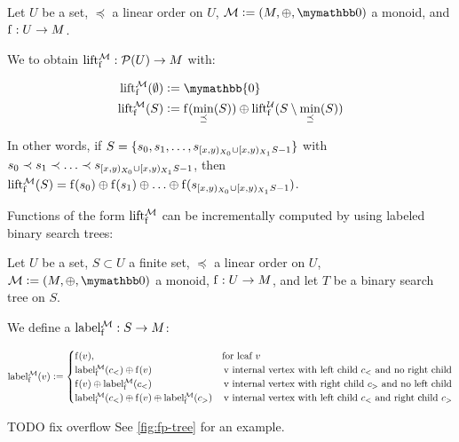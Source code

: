 \begin{definition}
Let $U$ be a set, $\preceq$ a linear order on $U$, $\mathcal{M} \defeq (M, \groupaddsym, \neutraladd)$ a monoid, and ${\operatorname{f}}: {U} \rightarrow {M}$.

We  to obtain ${\operatorname{lift_{\operatorname{f}}^{\mathcal{M}}}}: {\mathcal{P}({U})} \rightarrow {M}$ with:

\begin{align*}
\lift{\f}{\mathcal{M}}(\emptyset) &\defeq \mymathbb{0}\\
\lift{\f}{\mathcal{M}}(S) &\defeq \f(\min_{\preceq}(S)) \oplus \lift{\f}{\mathcal{U}}(S \setminus \min_{\preceq}(S))\\
\end{align*}

In other words, if $S = \{s_0, s_1, \ldots, s_{[{x},{y})_{X_0} \cup [{x},{y})_{X_1}{S} - 1}\}$ with $s_0 \prec s_1 \prec \ldots \prec s_{[{x},{y})_{X_0} \cup [{x},{y})_{X_1}{S} - 1}$, then $\operatorname{lift_{\operatorname{f}}^{\mathcal{M}}}(S) = {\operatorname{f}(s_0)} \oplus {{\operatorname{f}(s_1)} \oplus{{\ldots} \oplus{\operatorname{f}(s_{[{x},{y})_{X_0} \cup [{x},{y})_{X_1}{S} - 1})}}}$.
\end{definition}

Functions of the form $\operatorname{lift_{\operatorname{f}}^{\mathcal{M}}}$ can be incrementally computed by using labeled binary search trees:

\begin{definition}
Let $U$ be a set, $S \subset U$ a finite set, $\preceq$ a linear order on $U$, $\mathcal{M} \defeq (M, \groupaddsym, \neutraladd)$ a monoid, ${\operatorname{f}}: {U} \rightarrow {M}$, and let $T$ be a binary search tree on $S$.

We define a  ${\operatorname{label_{\operatorname{f}}^{\mathcal{M}}}}: {S} \rightarrow {M}$:

  \[
   \operatorname{label_{\operatorname{f}}^{\mathcal{M}}}(v) \vcentcolon= \begin{cases}
\operatorname{f}(v), &  \text{for leaf $v$} \\
{\operatorname{label_{\operatorname{f}}^{\mathcal{M}}}(c_{<})} \oplus {\operatorname{f}(v)} & \, \text{v internal vertex with left child $c_{<}$ and no right child}\\
{\operatorname{f}(v)} \oplus {\operatorname{label_{\operatorname{f}}^{\mathcal{M}}}(c_{<})} & \, \text{v internal vertex with right child $c_{>}$ and no left child}\\
{\operatorname{label_{\operatorname{f}}^{\mathcal{M}}}(c_{<})} \oplus {{\operatorname{f}(v)} \oplus{\operatorname{label_{\operatorname{f}}^{\mathcal{M}}}(c_{>})}} & \, \text{v internal vertex with left child $c_{<}$ and right child $c_{>}$}
\end{cases}
  \]

TODO fix overflow
See \cref{fig:fp-tree} for an example.
\end{definition}

